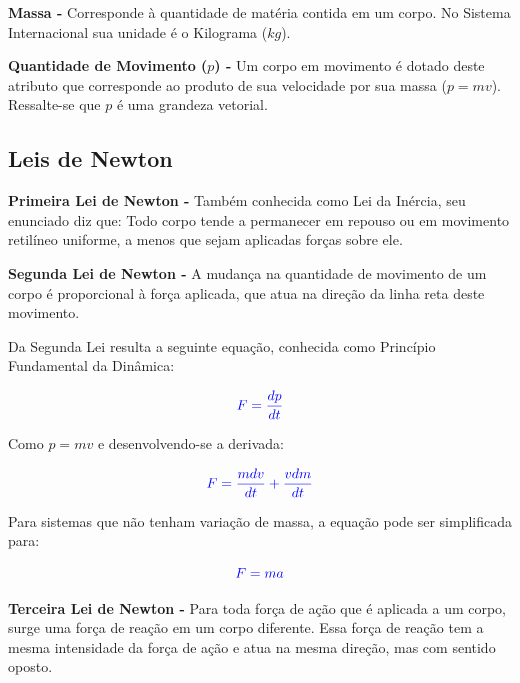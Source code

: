 \documentclass[
    12pt, %
    openright,
    twoside, %
    a4paper, %
    article,
    english,brazil %
]{abntex2}
\begin{document}
\textbf{Massa - } Corresponde à quantidade de matéria contida em um corpo. No Sistema Internacional sua unidade é o Kilograma ($kg$).

\textbf{Quantidade de Movimento ($p$) - } Um corpo em movimento é dotado deste atributo que corresponde ao produto de sua velocidade por sua massa ($p = mv$). Ressalte-se que $p$ é uma grandeza vetorial.

\subsection{Leis de Newton}

\textbf{Primeira Lei de Newton - } Também conhecida como Lei da Inércia, seu enunciado diz que: Todo corpo tende a permanecer em repouso ou em movimento retilíneo uniforme, a menos que sejam aplicadas forças sobre ele.

\textbf{Segunda Lei de Newton - } A mudança na quantidade de movimento de um corpo é proporcional à força aplicada, que atua na direção da linha reta deste movimento.

Da Segunda Lei resulta a seguinte equação, conhecida como Princípio Fundamental da Dinâmica:

\begin{equation}
    \color{blue}
    F = \frac{dp}{dt}
\end{equation}

Como $p = mv$ e desenvolvendo-se a derivada:

\begin{equation}
    \color{blue}
    F = \frac{mdv}{dt} + \frac{vdm}{dt}
\end{equation}

Para sistemas que não tenham variação de massa, a equação pode ser simplificada para:

\begin{equation}
    \color{blue}
    F = ma
\end{equation}

\textbf{Terceira Lei de Newton - } Para toda força de ação que é aplicada a um corpo, surge uma força de reação em um corpo diferente. Essa força de reação tem a mesma intensidade da força de ação e atua na mesma direção, mas com sentido oposto.
\end{document}
